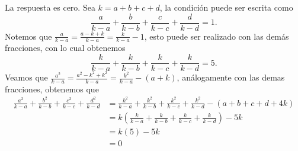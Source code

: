 \begin{solution}
    La respuesta es cero.
    Sea $k = a + b + c + d$, la condición puede ser escrita como
    \[
        \frac{a}{k - a} + \frac{b}{k - b} + \frac{c}{k - c} + \frac{d}{k - d} = 1.
    \]
    Notemos que $\frac{a}{k - a} = \frac{a - k + k}{k - a} = \frac{k}{k - a} - 1$, esto puede ser realizado con las demás fracciones, con lo cual obtenemos
    \[
        \frac{k}{k - a} + \frac{k}{k - b} + \frac{k}{k - c} + \frac{k}{k - d} = 5.
    \]
    Veamos que $\frac{a^2}{k - a} = \frac{a^2 - k^2 + k^2}{k - a} = \frac{k^2}{k - a} - (a + k)$, análogamente con las demas fracciones, obtenemos que
    \begin{align*}
        \frac{a^2}{k - a} + \frac{b^2}{k - b} + \frac{c^2}{k - c} + \frac{d^2}{k - d} &= \frac{k^2}{k - a} + \frac{k^2}{k - b} + \frac{k^2}{k - c} + \frac{k^2}{k - d} - (a + b + c + d + 4k)\\
        &= k\left(\frac{k}{k - a} + \frac{k}{k - b} + \frac{k}{k - c} + \frac{k}{k - d}\right) - 5k\\
        &= k(5) - 5k\\
        &= 0
    \end{align*}
\end{solution}